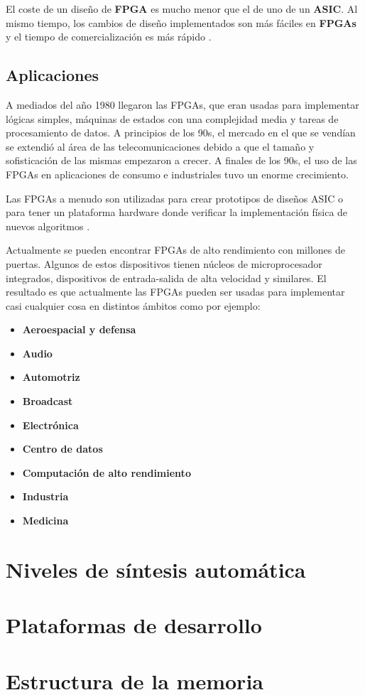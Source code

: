 El coste de un diseño de \textbf{FPGA} es mucho menor que el de uno de un \textbf{ASIC}. Al mismo tiempo, los cambios de diseño implementados 
son más fáciles en \textbf{FPGAs} y el tiempo de comercialización es más rápido \cite{maxfield2}.


\subsection{Aplicaciones}

A mediados del año 1980 llegaron las FPGAs, que eran usadas para implementar lógicas simples, máquinas de estados con una complejidad media 
y tareas de procesamiento de datos. A principios de los 90s, el mercado en el que se vendían se extendió al área de las telecomunicaciones 
debido a que el tamaño y sofisticación de las mismas empezaron a crecer. A finales de los 90s, el uso de las FPGAs en aplicaciones de consumo 
e industriales tuvo un enorme crecimiento.

Las FPGAs a menudo son utilizadas para crear prototipos de diseños ASIC o para tener un plataforma hardware donde verificar la implementación 
física de nuevos algoritmos \cite{maxfield1}. 

Actualmente se pueden encontrar FPGAs de alto rendimiento con millones de puertas. Algunos de estos dispositivos tienen núcleos de 
microprocesador integrados, dispositivos de entrada-salida de alta velocidad y similares. El resultado es que actualmente las FPGAs pueden ser 
usadas para implementar casi cualquier cosa en distintos ámbitos como por ejemplo:

\begin{itemize}
    \item \textbf{Aeroespacial y defensa} 
    \item \textbf{Audio} 
    \item \textbf{Automotriz} 
    \item \textbf{Broadcast} 
    \item \textbf{Electrónica} 
    \item \textbf{Centro de datos} 
    \item \textbf{Computación de alto rendimiento} 
    \item \textbf{Industria} 
    \item \textbf{Medicina} 
\end{itemize}

\section{Niveles de síntesis automática}  

\section{Plataformas de desarrollo} 

\section{Estructura de la memoria} 
 
 
 